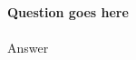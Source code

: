 \documentclass[11pt]{homework}
\begin{document}
\maketitle

\question
\textbf{Question goes here}\\
\\
Answer
\end{document}
